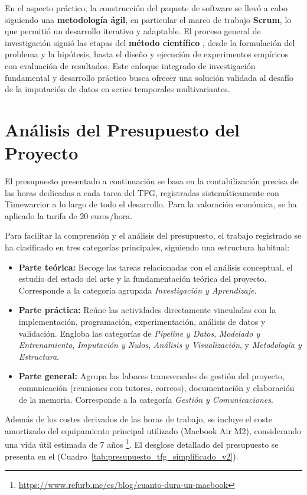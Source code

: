 En el aspecto práctico, la construcción del paquete de software se llevó a cabo siguiendo una \textbf{metodología ágil}, en particular el marco de trabajo \textbf{Scrum}, lo que permitió un desarrollo iterativo y adaptable. El proceso general de investigación siguió las etapas del \textbf{método científico} , desde la formulación del problema y la hipótesis, hasta el diseño y ejecución de experimentos empíricos con evaluación de resultados. Este enfoque integrado de investigación fundamental y desarrollo práctico busca ofrecer una solución validada al desafío de la imputación de datos en series temporales multivariantes.

\section{Análisis del Presupuesto del Proyecto}

El presupuesto presentado a continuación se basa en la contabilización precisa de las horas dedicadas a cada tarea del TFG, registradas sistemáticamente con Timewarrior a lo largo de todo el desarrollo. Para la valoración económica, se ha aplicado la tarifa de 20 euros/hora. \citep{MemoriaTFG}

Para facilitar la comprensión y el análisis del presupuesto, el trabajo registrado se ha clasificado en tres categorías principales, siguiendo una estructura habitual:
\begin{itemize}
    \item \textbf{Parte teórica:} Recoge las tareas relacionadas con el análisis conceptual, el estudio del estado del arte y la fundamentación teórica del proyecto. Corresponde a la categoría agrupada \textit{Investigación y Aprendizaje}.
    \item \textbf{Parte práctica:} Reúne las actividades directamente vinculadas con la implementación, programación, experimentación, análisis de datos y validación. Engloba las categorías de \textit{Pipeline y Datos}, \textit{Modelado y Entrenamiento}, \textit{Imputación y Nulos}, \textit{Análisis y Visualización}, y \textit{Metodología y Estructura}.
    \item \textbf{Parte general:} Agrupa las labores transversales de gestión del proyecto, comunicación (reuniones con tutores, correos), documentación y elaboración de la memoria. Corresponde a la categoría \textit{Gestión y Comunicaciones}.
\end{itemize}
Además de los costes derivados de las horas de trabajo, se incluye el coste amortizado del equipamiento principal utilizado (Macbook Air M2), considerando una vida útil estimada de 7 años \footnote{\url{https://www.refurb.me/es/blog/cuanto-dura-un-macbook}}. El desglose detallado del presupuesto se presenta en el (Cuadro~\ref{tab:presupuesto_tfg_simplificado_v2}).

